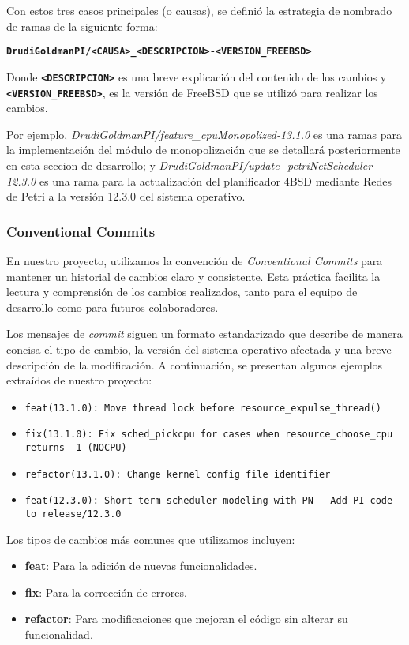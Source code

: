 Con estos tres casos principales (o causas), se definió la estrategia de nombrado de ramas de la siguiente forma:

\begin{center}
    \texttt{\textbf{DrudiGoldmanPI/<CAUSA>\_<DESCRIPCION>-<VERSION\_FREEBSD>}}
\end{center}

Donde \texttt{\textbf{<DESCRIPCION>}} es una breve explicación del contenido de los cambios y \texttt{\textbf{<VERSION\_FREEBSD>}}, es la versión de FreeBSD que se utilizó para realizar los cambios.

Por ejemplo, \textit{DrudiGoldmanPI/feature\_cpuMonopolized-13.1.0} es una ramas para la implementación del módulo de monopolización que se detallará posteriormente en esta seccion de desarrollo; y \textit{DrudiGoldmanPI/update\_petriNetScheduler-12.3.0} es una rama para la actualización del planificador 4BSD mediante Redes de Petri a la versión 12.3.0 del sistema operativo.

\subsubsection{Conventional Commits}
En nuestro proyecto, utilizamos la convención de \textit{Conventional Commits} para mantener un historial de cambios claro y consistente. Esta práctica facilita la lectura y comprensión de los cambios realizados, tanto para el equipo de desarrollo como para futuros colaboradores.

Los mensajes de \textit{commit} siguen un formato estandarizado que describe de manera concisa el tipo de cambio, la versión del sistema operativo afectada y una breve descripción de la modificación. A continuación, se presentan algunos ejemplos extraídos de nuestro proyecto:

\begin{itemize}
    \item \texttt{feat(13.1.0): Move thread lock before resource\_expulse\_thread()}
    \item \texttt{fix(13.1.0): Fix sched\_pickcpu for cases when resource\_choose\_cpu returns -1 (NOCPU)}
    \item \texttt{refactor(13.1.0): Change kernel config file identifier}
    \item \texttt{feat(12.3.0): Short term scheduler modeling with PN - Add PI code to release/12.3.0}
\end{itemize}

Los tipos de cambios más comunes que utilizamos incluyen:
\begin{itemize}
    \item \textbf{feat}: Para la adición de nuevas funcionalidades.
    \item \textbf{fix}: Para la corrección de errores.
    \item \textbf{refactor}: Para modificaciones que mejoran el código sin alterar su funcionalidad.
\end{itemize}

